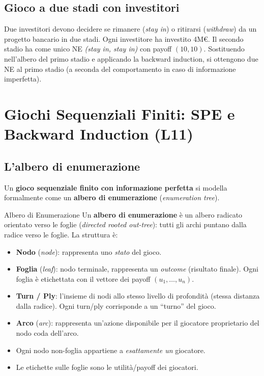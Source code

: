 \documentclass[12pt,a4paper,twoside]{book}
\theoremstyle{plain}
\theoremstyle{definition}
\begin{document}
\section{Gioco a due stadi con investitori}

Due investitori devono decidere se rimanere (\emph{stay in}) o ritirarsi (\emph{withdraw}) da un progetto bancario in due stadi. Ogni investitore ha investito 4M€. Il secondo stadio ha come unico NE \emph{(stay in, stay in)} con payoff $(10,10)$. Sostituendo nell'albero del primo stadio e applicando la backward induction, si ottengono due NE al primo stadio (a seconda del comportamento in caso di informazione imperfetta).

\chapter{Giochi Sequenziali Finiti: SPE e Backward Induction (L11)}
\label{ch:seq-finite}

\section{L'albero di enumerazione}

Un \textbf{gioco sequenziale finito con informazione perfetta} si modella formalmente come un \textbf{albero di enumerazione} (\emph{enumeration tree}).

\begin{defbox}{Albero di Enumerazione}
Un \textbf{albero di enumerazione} è un albero radicato orientato verso le foglie (\emph{directed rooted out-tree}): tutti gli archi puntano dalla radice verso le foglie. La struttura è:
\begin{itemize}
  \item \textbf{Nodo} (\emph{node}): rappresenta uno \emph{stato} del gioco.
  \item \textbf{Foglia} (\emph{leaf}): nodo terminale, rappresenta un \emph{outcome} (risultato finale). Ogni foglia è etichettata con il vettore dei payoff $(u_1,\dots,u_n)$.
  \item \textbf{Turn / Ply}: l'insieme di nodi allo stesso livello di profondità (stessa distanza dalla radice). Ogni turn/ply corrisponde a un ``turno'' del gioco.
  \item \textbf{Arco} (\emph{arc}): rappresenta un'azione disponibile per il giocatore proprietario del nodo coda dell'arco.
  \item Ogni nodo non-foglia appartiene a \emph{esattamente un} giocatore.
  \item Le etichette sulle foglie sono le utilità/payoff dei giocatori.
\end{itemize}
\end{defbox}
\end{document}
